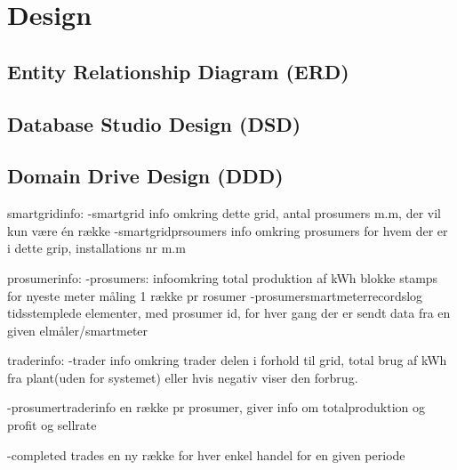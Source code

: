 
\section{Design}

\subsection{Entity Relationship Diagram (ERD)}

\subsection{Database Studio Design (DSD)}

\subsection{Domain Drive Design (DDD)}





smartgridinfo:
-smartgrid
    info omkring dette grid, antal prosumers m.m, der vil kun være én række
-smartgridprsoumers
    info omkring prosumers for hvem der er i dette grip, installations nr m.m

prosumerinfo:
-prosumers:
    infoomkring total produktion af kWh blokke
    stamps for nyeste meter måling 1 række pr rosumer
-prosumersmartmeterrecordslog
    tidsstemplede elementer, med prosumer id, for hver gang der er sendt data fra en given elmåler/smartmeter


traderinfo:
-trader
    info omkring trader delen i forhold til grid, total brug af kWh fra plant(uden for systemet) eller hvis negativ viser den forbrug. 

-prosumertraderinfo
    en række pr prosumer, giver info om totalproduktion og profit og sellrate

-completed trades
    en ny række for hver enkel handel for en given periode
